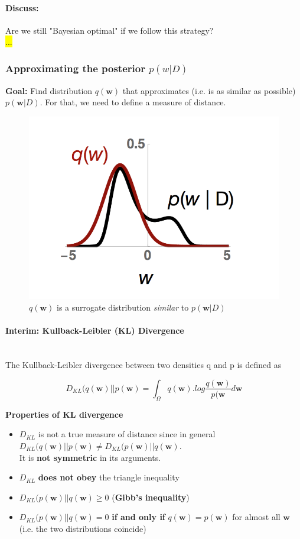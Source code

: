 \documentclass[main]{subfiles}
\begin{document}
\paragraph{Discuss:} Are we still "Bayesian optimal" if we follow this strategy?\\

\hl{...}


\subsubsection{Approximating the posterior $p(w|D)$}
\textbf{Goal:} Find distribution $q(\bm{w})$ that approximates (i.e. is as similar as possible) $p(\bm{w}|D)$. For that, we need to define a measure of distance.\\
\begin{figure}[H]
    	\centering
    	\includegraphics[width=0.6\linewidth]{05_LearningAsBayesianInference/figures/q_posterior.png}
    	\caption{$q(\bm{w})$ is a surrogate distribution \textit{similar} to $p(\bm{w}|D)$}
    	\label{fig:q_posterior}
    \end{figure}
\paragraph{Interim: Kullback-Leibler (KL) Divergence}\\

The Kullback-Leibler divergence between two densities q and p is
defined as

\begin{equation}
    D_{KL}(q(\bm{w})||p(\bm{w}) = \int_\Omega q(\bm{w}) . log \frac{q(\bm{w})}{p(\bm{w}} d\bm{w}
    \label{eq:KL}
\end{equation}

\textbf{Properties of KL divergence}
\begin{itemize}
    \item $D_{KL}$ is not a true measure of distance since in general \\ $D_{KL}(q(\bm{w})||p(\bm{w}) \neq D_{KL}(p(\bm{w})||q(\bm{w})$.\\ It is \textbf{not symmetric} in its arguments.
    \item $D_{KL}$ \textbf{does not obey} the triangle inequality
    \item $D_{KL}(p(\bm{w})||q(\bm{w}) \geq{0}$ (\textbf{Gibb's inequality})
    \item $D_{KL}(p(\bm{w})||q(\bm{w})={0}$ \textbf{if and only if} $q(\bm{w}) = p(\bm{w})$ for almost all $\bm{w}$ (i.e. the two distributions coincide)
\end{itemize}
\end{document}
